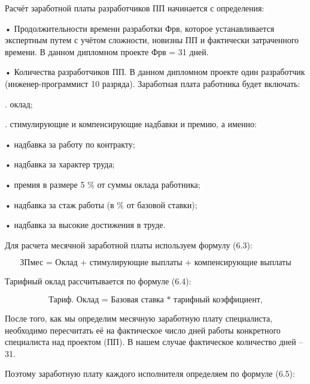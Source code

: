 {	\par \redline Расчёт заработной платы разработчиков ПП начинается с определения:
	\par \redline •	Продолжительности времени разработки Фрв, которое устанавливается экспертным путем с учётом сложности, новизны ПП и фактически затраченного времени. В данном дипломном проекте Фрв = 31 дней.
	\par \redline •	Количества разработчиков ПП. В данном дипломном проекте один разработчик (инженер-программист 10 разряда).
	Заработная плата работника будет включать:
	\par {}. оклад;
	\par {}. стимулирующие и компенсирующие надбавки и премию, а именно:
	\par \redline \hspace{15mm} •	надбавка за работу по контракту;
	\par \redline \hspace{15mm} •	надбавка за характер труда;
	\par \redline \hspace{15mm} •	премия в размере 5 \% от суммы оклада работника;
	\par \redline \hspace{15mm} •	надбавка за стаж работы (в \% от базовой ставки);
	\par \redline \hspace{15mm} •	надбавка за высокие достижения в труде.
	\par \redline Для расчета месячной заработной платы используем формулу (6.3):

	\begin{equation}
		\textrm{ЗПмес = Оклад + стимулирующие выплаты + компенсирующие выплаты} 
	\end{equation}
	
	\par \redline Тарифный оклад рассчитывается по формуле (6.4):
	
	\begin{equation}
		\textrm{Тариф. Оклад = Базовая ставка * тарифный коэффициент,}
	\end{equation}
	
	\par \redline После того, как мы определим месячную заработную плату специалиста, необходимо пересчитать её на фактическое число дней работы конкретного специалиста над проектом (ПП). В нашем случае фактическое количество дней – 31.
	\par \redline Поэтому заработную плату каждого исполнителя определяем по формуле (6.5):
	
}
